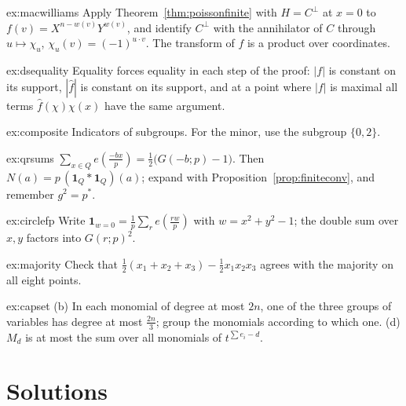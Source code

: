 \begin{hint}{ex:macwilliams}
Apply Theorem~\ref{thm:poissonfinite} with $H=C^\perp$ at $x=0$ to $f(v)=X^{n-w(v)}Y^{w(v)}$, and identify $C^\perp$ with the annihilator of $C$ through
$u\mapsto\chi_u$, $\chi_u(v)=(-1)^{u\cdot v}$. The transform of $f$ is a product over coordinates.
\end{hint}
\begin{hint}{ex:dsequality}
Equality forces equality in each step of the proof: $|f|$ is constant on its support, $|\hat f|$ is constant on its support, and at a point
where $|f|$ is maximal all terms $\hat f(\chi)\chi(x)$ have the same argument.
\end{hint}
\begin{hint}{ex:composite}
Indicators of subgroups. For the minor, use the subgroup $\{0,2\}$.
\end{hint}
\begin{hint}{ex:qrsums}
$\sum_{x\in Q}e(\frac{-bx}p)=\frac12\bigl(G(-b;p)-1\bigr)$. Then $N(a)=p\,(\mathbf 1_Q*\mathbf 1_Q)(a)$; expand with Proposition~\ref{prop:finiteconv}, and remember $g^2=p^*$.
\end{hint}
\begin{hint}{ex:circlefp}
Write $\mathbf 1_{w=0}=\frac1p\sum_re(\frac{rw}p)$ with $w=x^2+y^2-1$; the double sum over $x,y$ factors into $G(r;p)^2$.
\end{hint}
\begin{hint}{ex:majority}
Check that $\frac12(x_1+x_2+x_3)-\frac12x_1x_2x_3$ agrees with the majority on all eight points.
\end{hint}
\begin{hint}{ex:capset}
(b) In each monomial of degree at most $2n$, one of the three groups of variables has degree at most $\frac{2n}3$; group the monomials
according to which one. (d) $M_d$ is at most the sum over all monomials of $t^{\sum e_i-d}$.
\end{hint}

\section{Solutions}

